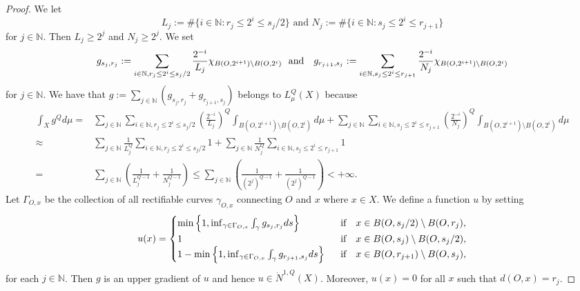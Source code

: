 \documentclass[10pt,a4paper]{amsart}
\begin{document}
\begin{proof}
 We let 
\[\text{
$L_j:=\#\{i\in\mathbb N: r_j\leq 2^i\leq s_j/2\}$ \ and \  $N_j:=\#\{i\in\mathbb N: s_j\leq 2^i\leq r_{j+1}\}$
}
\]
for $j\in\mathbb N$.
 Then $L_j\geq 2^j$ and $N_j\geq 2^j$. We set 
 \[
 g_{s_{j}, r_j}:=  \sum_{i\in\mathbb N, r_j\leq 2^i\leq s_j/2} \frac{2^{-i}}{L_j} \chi_{B(O,2^{i+1})\setminus B(O,2^{i})} \text{\rm \ \ and \ \ } g_{r_{j+1}, s_j}:= \sum_{i\in\mathbb N, s_j\leq 2^i\leq r_{j+1}} \frac{2^{-i}}{N_j}  \chi_{B(O,2^{i+1})\setminus B(O,2^{i})}
 \]
for $j\in\mathbb N$.
 We have that $g:=\sum_{j\in\mathbb N} (g_{s_{j}, r_j}+  g_{r_{j+1}, s_j})$ belongs to $L_\mu^Q(X)$ because 
 \begin{align*}
 \int_Xg^Qd\mu=& \sum_{j\in\mathbb N}  \sum_{i\in\mathbb N, r_j\leq 2^i\leq s_j/2} \left(\frac{2^{-i}}{L_j}\right)^Q \int_{ B(O,2^{i+1})\setminus B(O,2^{i})}d\mu +  \sum_{j\in\mathbb N}  \sum_{i\in\mathbb N, s_j\leq 2^i\leq r_{j+1}} \left(\frac{2^{-i}}{N_j}\right)^Q \int_{ B(O,2^{i+1})\setminus B(O,2^{i})}d\mu \\
 \approx & \sum_{j\in\mathbb N} \frac{1}{L_j^Q}  \sum_{i\in\mathbb N, r_j\leq 2^i\leq s_j/2}  1 + \sum_{j\in\mathbb N}\frac{1}{N_j^Q}  \sum_{i\in\mathbb N, s_j\leq 2^i\leq r_{j+1}}  1\\
 =& \sum_{j\in\mathbb N} \left(\frac{1}{L_j^{Q-1}}+\frac{1}{N_j^{Q-1}}\right)\leq \sum_{j\in\mathbb N} \left(\frac{1}{(2^{j})^{Q-1}} +\frac{1}{(2^j)^{Q-1}}\right)<+\infty. 
 \end{align*}
 Let $\Gamma_{O,x}$ be the collection of all rectifiable curves $\gamma_{O,x}$ connecting $O$ and $x$ where $x\in X$. We define a function $u$ by setting
 \[	
 u(x)=
 \begin{cases}
 	\min\left\{1, \inf_{\gamma\in\Gamma_{O,x}} \int_{\gamma} g_{s_j,r_j}ds \right\}	 & \text{\rm \ \ if \ \ $x\in B(O,s_j/2)\setminus B(O,r_j)$},\\ 
	1& \text{\rm \ \ if \ \ $x\in B(O,s_j)\setminus B(O,s_j/2)$},\\
	1- \min\left\{1, \inf_{\gamma\in\Gamma_{O,x}} \int_{\gamma} g_{r_{j+1},s_j}ds \right\}	& \text{\rm \ \ if \ \ $x\in B(O,r_{j+1})\setminus B(O,s_j)$},
\end{cases}
 \]
for each $j\in\mathbb N$.
 Then $g$ is an upper gradient of $u$ and hence $u\in\dot N^{1,Q}(X)$.  Moreover, $u(x)=0$ for all $x$ such that $d(O,x)=r_j$.  


\end{proof}
\end{document}
